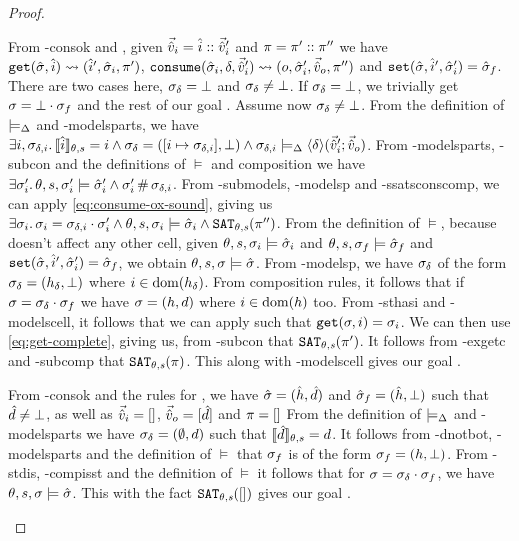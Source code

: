 \begin{proof}
\begin{hypvlist}
 From \hyp{consok} and , given $\vec{\hat{v}}_i=\hat{i}::\vec{\hat{v}}_i'$ and $\pi=\pi'::\pi''$ we have $\texttt{get}(\hat{\sigma},\hat{i})\rightsquigarrow(\hat{i}', \hat{\sigma}_i, \pi')$, ${\texttt{consume}(\hat{\sigma}_i,\delta,\vec{\hat{v}}_i')\rightsquigarrow (o,\hat{\sigma}_i',\vec{\hat{v}}_o,\pi'')}$ and $\texttt{set}(\hat{\sigma},\hat{i}',\hat{\sigma}_i')=\hat{\sigma}_f$.
 There are two cases here, $\sigma_\delta=\bot$ and $\sigma_\delta\neq\bot$. If $\sigma_\delta=\bot$, we trivially get $\sigma=\bot\cdot\sigma_f$ and the rest of our goal .
 Assume now $\sigma_\delta\neq\bot$. From the definition of $\models_{\Delta}$ and \hyp{modelsparts}, we have $\exists i, \sigma_{\delta,i}\ldotp {\llbracket\hat{i}\rrbracket_{\theta,s}=i} \land {\sigma_\delta=([i\mapsto\sigma_{\delta,i}],\bot)} \land \sigma_{\delta,i}\models_{\Delta} \left<\delta\right>\!(\vec{\hat{v}}_i';\vec{\hat{v}}_o)$.
 From \hyp{modelsparts}, \hyp{subcon} and the definitions of $\models$  and composition we have $\exists \sigma_i'\ldotp {\theta,s,\sigma_i'\models\hat{\sigma}_i'} \land \sigma_i' \operatorname{\#} \sigma_{\delta,i}$.
 From \hyp{submodels}, \hyp{modelsp} and \hyp{ssatsconscomp}, we can apply \ref{eq:consume-ox-sound}, giving us $\exists \sigma_i\ldotp {\sigma_i=\sigma_{\delta,i}\cdot\sigma_i'} \land \theta,s,\sigma_i\models \hat{\sigma}_i \land \texttt{SAT}_{\mathit{\theta,s}}(\pi'')$.
 From the definition of $\models$, because \consume{} doesn't affect any other cell, given ${\theta,s,\sigma_i\models\hat{\sigma}_i}$ and $\theta,s,\sigma_f\models\hat{\sigma}_f$ and $\texttt{set}(\hat{\sigma},\hat{i}',\hat{\sigma}_i')=\hat{\sigma}_f$, we obtain $\theta,s,\sigma\models\hat{\sigma}$.
 From \hyp{modelsp}, we have $\sigma_\delta$ of the form $\sigma_\delta=(h_\delta,\bot)$ where $i\in \operatorname{dom}(h_\delta)$. From composition rules, it follows that if $\sigma=\sigma_\delta\cdot\sigma_f$ we have $\sigma=(h,d)$ where $i\in \operatorname{dom}(h)$ too.
 From \hyp{sthasi} and \hyp{modelscell}, it follows that we can apply  such that ${\texttt{get}(\sigma,i)=\sigma_i}$. We can then use \ref{eq:get-complete}, giving us, from \hyp{subcon} that $\texttt{SAT}_{\mathit{\theta,s}}(\pi')$.
 It follows from \hyp{exgetc} and \hyp{subcomp} that $\texttt{SAT}_{\mathit{\theta,s}}(\pi)$. This along with \hyp{modelscell} gives our goal .
\end{hypvlist}

\pfcase{$\delta = \domainset$}

\begin{hypvlist}
 From \hyp{consok} and the rules for \consume{}, we have $\hat{\sigma}=(\hat{h},\hat{d})$ and $\hat{\sigma}_f=(\hat{h},\bot)$ such that $\hat{d}\neq\bot$, as well as $\vec{\hat{v}}_i=[]$, $\vec{\hat{v}}_o=[\hat{d}]$ and $\pi=[]$
 From the definition of $\models_{\Delta}$ and \hyp{modelsparts} we have $\sigma_\delta=(\emptyset, d)$ such that $\llbracket\hat{d}\rrbracket_{\theta,s}=d$.
 It follows from \hyp{dnotbot}, \hyp{modelsparts} and the definition of $\models$ that $\sigma_f$ is of the form $\sigma_f=(h, \bot)$.
 From \hyp{stdis}, \hyp{compisst} and the definition of $\models$ it follows that for $\sigma=\sigma_\delta\cdot\sigma_f$, we have $\theta,s,\sigma\models\hat{\sigma}$. This with the fact $\texttt{SAT}_{\mathit{\theta,s}}([])$ gives our goal .
\end{hypvlist}


\end{proof}
